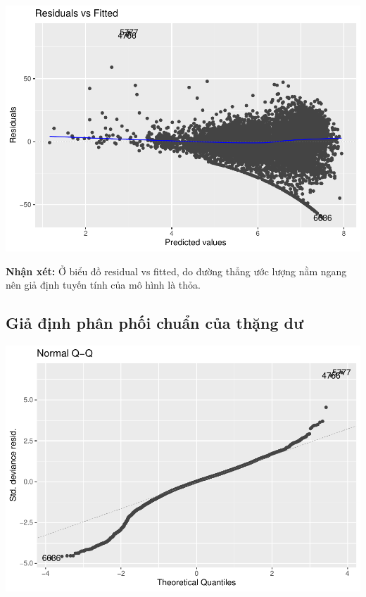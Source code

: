 \documentclass[
  11pt,
  letterpaper,
]{article}
\begin{document}
\begin{center}\includegraphics[width=1.2\linewidth,]{Final_Project_files/figure-latex/unnamed-chunk-32-1} \end{center}

\textbf{Nhận xét:} Ở biểu đồ residual vs fitted, do đường thẳng ước lượng nằm ngang nên giả định tuyến tính của mô hình là thỏa.

\subsection{Giả định phân phối chuẩn của thặng dư}

\begin{center}\includegraphics[width=1.2\linewidth,]{Final_Project_files/figure-latex/unnamed-chunk-33-1} \end{center}
\end{document}
